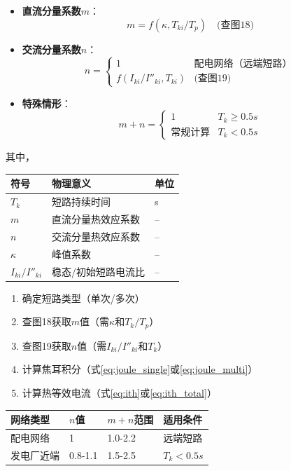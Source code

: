 \documentclass[a4paper,11pt,AutoFakeBold]{ctexart}
\begin{document}
\begin{itemize}
\item \textbf{直流分量系数$m$}：
  \[
  m = f(\kappa, T_{ki}/T_p) \quad \text{(查图18)}
  \]
  
\item \textbf{交流分量系数$n$}：
  \[
  n = 
  \begin{cases}
  1 & \text{配电网络（远端短路）} \\
  f(I_{ki}/I''_{ki}, T_{ki}) & \text{(查图19)}
  \end{cases}
  \]
  
\item \textbf{特殊情形}：
  \[
  m+n = 
  \begin{cases}
  1 & T_k \geq 0.5\si{s} \\
  \text{常规计算} & T_k < 0.5\si{s}
  \end{cases}
  \]
\end{itemize}

其中，

\begin{tabular}{lll}
符号 & 物理意义 & 单位 \\
\hline
$T_k$ & 短路持续时间 & \si{s} \\
$m$ & 直流分量热效应系数 & -- \\
$n$ & 交流分量热效应系数 & -- \\
$\kappa$ & 峰值系数 & -- \\
$I_{ki}/I''_{ki}$ & 稳态/初始短路电流比 & -- \\
\end{tabular}

\begin{enumerate}
\item 确定短路类型（单次/多次）
\item 查图18获取$m$值（需$\kappa$和$T_k/T_p$）
\item 查图19获取$n$值（需$I_{ki}/I''_{ki}$和$T_k$）
\item 计算焦耳积分（式\ref{eq:joule_single}或\ref{eq:joule_multi}）
\item 计算热等效电流（式\ref{eq:ith}或\ref{eq:ith_total}）
\end{enumerate}

\begin{tabular}{llll}
网络类型 & $n$值 & $m+n$范围 & 适用条件 \\
\hline
配电网络 & 1 & 1.0-2.2 & 远端短路 \\
发电厂近端 & 0.8-1.1 & 1.5-2.5 & $T_k<0.5\si{s}$ \\
\end{tabular}
\end{document}
